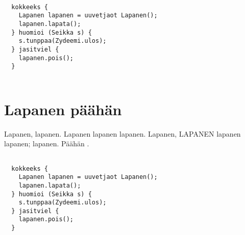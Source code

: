 \documentclass[a4paper]{article}
\begin{document}
\begin{multicols}{2}
\begin{lstlisting}[numbers=none, caption=Lapanen kokkeeks käsin]

  kokkeeks {
    Lapanen lapanen = uuvetjaot Lapanen();
    lapanen.lapata();
  } huomioi (Seikka s) {
    s.tunppaa(Zydeemi.ulos);
  } jasitviel {
    lapanen.pois();
  }
  
\end{lstlisting}


\section{Lapanen päähän}

Lapanen, lapanen. Lapanen lapanen lapanen. Lapanen, LAPANEN lapanen lapanen; lapanen. Päähän \cite{kokkeeks}.


\begin{lstlisting}[numbers=none, caption=Lip-lap lapanen: Lavanne]

  kokkeeks {
    Lapanen lapanen = uuvetjaot Lapanen();
    lapanen.lapata();
  } huomioi (Seikka s) {
    s.tunppaa(Zydeemi.ulos);
  } jasitviel {
    lapanen.pois();
  }
  
\end{lstlisting}




\end{multicols}

\printbibliography[title={Lapautteet}]
\lstlistoflistings
\end{document}
